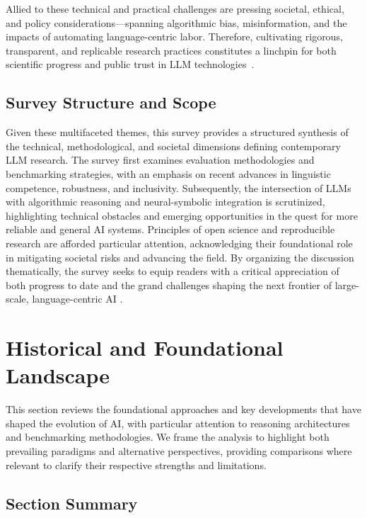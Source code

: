 \documentclass[sigconf]{acmart}
\begin{document}
Allied to these technical and practical challenges are pressing societal, ethical, and policy considerations—spanning algorithmic bias, misinformation, and the impacts of automating language-centric labor. Therefore, cultivating rigorous, transparent, and replicable research practices constitutes a linchpin for both scientific progress and public trust in LLM technologies~\cite{ref42,ref54,ref86}.

\subsection{Survey Structure and Scope}

Given these multifaceted themes, this survey provides a structured synthesis of the technical, methodological, and societal dimensions defining contemporary LLM research. The survey first examines evaluation methodologies and benchmarking strategies, with an emphasis on recent advances in linguistic competence, robustness, and inclusivity. Subsequently, the intersection of LLMs with algorithmic reasoning and neural-symbolic integration is scrutinized, highlighting technical obstacles and emerging opportunities in the quest for more reliable and general AI systems. Principles of open science and reproducible research are afforded particular attention, acknowledging their foundational role in mitigating societal risks and advancing the field. By organizing the discussion thematically, the survey seeks to equip readers with a critical appreciation of both progress to date and the grand challenges shaping the next frontier of large-scale, language-centric AI \cite{ref42,ref49,ref54,ref86}.

\section{Historical and Foundational Landscape}

This section reviews the foundational approaches and key developments that have shaped the evolution of AI, with particular attention to reasoning architectures and benchmarking methodologies. We frame the analysis to highlight both prevailing paradigms and alternative perspectives, providing comparisons where relevant to clarify their respective strengths and limitations.

\subsection*{Section Summary}
\end{document}
